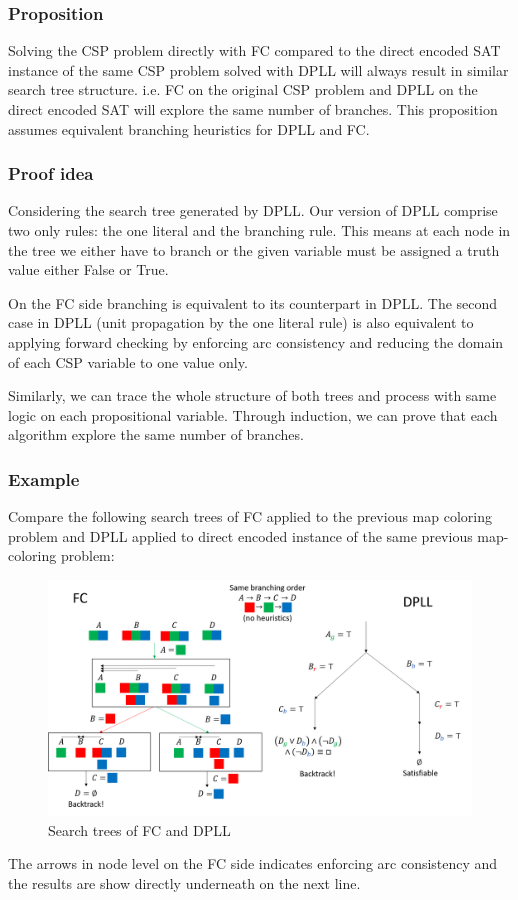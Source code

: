 \subsubsection{Proposition}
Solving the CSP problem directly with FC compared to the direct encoded SAT instance of the same CSP problem solved with DPLL will always result in similar search tree structure. i.e. FC on the original CSP problem and DPLL on the direct encoded SAT will explore the same number of branches. This proposition assumes equivalent branching heuristics for DPLL and FC.

\subsubsection{Proof idea}
Considering the search tree generated by DPLL. Our version of DPLL comprise two only rules: the one literal and the branching rule. This means at each node in the tree we either have to branch or the given variable must be assigned a truth value either False or True. 

On the FC side branching is equivalent to its counterpart in DPLL. The second case in DPLL (unit propagation by the one literal rule) is also equivalent to applying forward checking by enforcing arc consistency and reducing the domain of each CSP variable to one value only.

Similarly, we can trace the whole structure of both trees and process with same logic on each propositional variable. Through induction, we can prove that each algorithm explore the same number of branches. 

\subsubsection{Example}
Compare the following search trees of FC applied to the previous map coloring problem and DPLL applied to direct encoded instance of the same previous map-coloring problem:
\begin{figure}[H]
	\centering
	\includegraphics[width=1\linewidth]{assets/direct_fc_vs_dpll}
	\captionsetup{justification=centering,margin=2cm}
	\caption{Search trees of FC and DPLL}
	\label{fig:direct_fc_vs_dpll}
\end{figure} 
The arrows in node level on the FC side indicates enforcing arc consistency and the results are show directly underneath on the next line.



